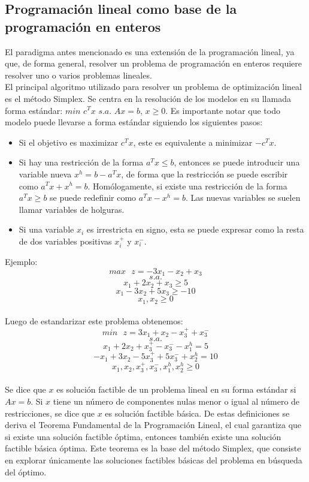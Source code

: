\documentclass[12pt]{report}
\begin{document}
\subsection{Programación lineal como base de la programación en enteros}

El paradigma antes mencionado es una extensión de la programación lineal, ya que, de forma general, resolver un problema de programación en enteros requiere resolver uno o varios problemas lineales.\\

El principal algoritmo utilizado para resolver un problema de optimización lineal es el método Simplex. Se centra en la resolución de los modelos en su llamada forma estándar: $min$ $c^Tx$ $s.a.$ $Ax=b$, $x\geq 0$. Es importante notar que todo modelo puede llevarse a forma estándar siguiendo los siguientes pasos:
\begin{itemize}
    \item Si el objetivo es maximizar $c^Tx$, este es equivalente a minimizar $-c^Tx$.
    \item Si hay una restricción de la forma $a^Tx\leq b$, entonces se puede introducir una variable nueva $x^h=b-a^Tx$, de forma que la restricción se puede escribir como $a^Tx+x^h=b$. Homólogamente, si existe una restricción de la forma $a^Tx\geq b$ se puede redefinir como $a^Tx-x^h=b$. Las nuevas variables se suelen llamar variables de holguras.
    \item Si una variable $x_i$ es irrestricta en signo, esta se puede expresar como la resta de dos variables positivas $x_i^+$ y $x_i^-$.\\
\end{itemize}

Ejemplo:
$$max \text{ }z= -3x_1-x_2+x_3$$
$$s.a.$$
$$x_1+2x_2+x_3\geq 5$$
$$x_1-3x_2+5x_3\geq -10$$
$$x_1,x_2\geq 0$$\\

Luego de estandarizar este problema obtenemos:
$$min \text{ }z= 3x_1+x_2-x_3^++x_3^-$$
$$s.a.$$
$$x_1+2x_2+x_3^+-x_3^--x_1^h=5$$
$$-x_1+3x_2-5x_3^++5x_3^-+x_2^h=10$$
$$x_1,x_2,x_3^+,x_3^-,x_1^h,x_2^h\geq 0$$\\

Se dice que $x$ es solución factible de un problema lineal en su forma estándar si $Ax=b$. Si $x$ tiene un número de componentes nulas menor o igual al número de restricciones, se dice que $x$ es solución factible básica. De estas definiciones se deriva el Teorema Fundamental de la Programación Lineal, el cual garantiza que si existe una solución factible óptima, entonces también existe una solución factible básica óptima. Este teorema es la base del método Simplex, que consiste en explorar únicamente las soluciones factibles básicas del problema en búsqueda del óptimo.\\
\end{document}
